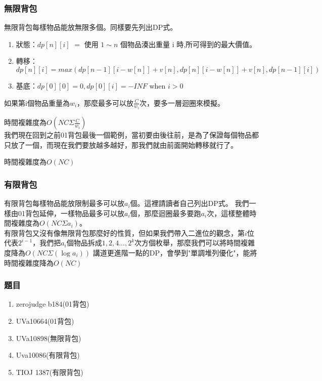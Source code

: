 \subsubsection{無限背包}
無限背包每樣物品能放無限多個。同樣要先列出DP式。
\begin{enumerate}
\item 狀態：$dp[n][i]$ $=$ 使用 $1 ∼ n$ 個物品湊出重量 i 時,所可得到的最大價值。
\item 轉移：$dp[n][i] = max(dp[n − 1][i − w[n]] + v[n], dp[n][i − w[n]] + v[n], dp[n − 1][i])$
\item 基底：$dp[0][0] = 0, dp[0][i] = −INF$ when $i>0$
\end{enumerate}
如果第i個物品重量為$w_i$，那麼最多可以放$\frac{C}{w_i}$次，要多一層迴圈來模擬。

時間複雜度為$O(NC\Sigma\frac{C}{w_i})$\\
我們現在回到之前01背包最後一個範例，當初要由後往前，是為了保證每個物品都只放了一個，而現在我們要放越多越好，那我們就由前面開始轉移就行了。

時間複雜度為$O(NC)$
\subsubsection{有限背包}
有限背包每樣物品能放限制最多可以放$a_i$個。這裡請讀者自己列出DP式。
我們一樣由01背包延伸，一樣物品最多可以放$a_i$個，那麼迴圈最多要跑$a_i$次，這樣整體時間複雜度為$O(NC\Sigma a_i)$。\\
有限背包又沒有像無限背包那麼好的性質，但如果我們帶入二進位的觀念，第$i$位代表$2^{i-1}$，我們把$a_i$個物品拆成$1,2,4...,2^k$次方個枚舉，那麼我們可以將時間複雜度降為$O(NC\Sigma(\log a_i))$
講道更進階一點的DP，會學到"單調堆列優化"，能將時間複雜度降為$O(NC)$
\subsubsection{題目}
\begin{enumerate}
\item zerojudge b184(01背包)
\item UVa10664(01背包)
\item UVa10898(無限背包)
\item Uva10086(有限背包)
\item TIOJ 1387(有限背包)
\end{enumerate}
